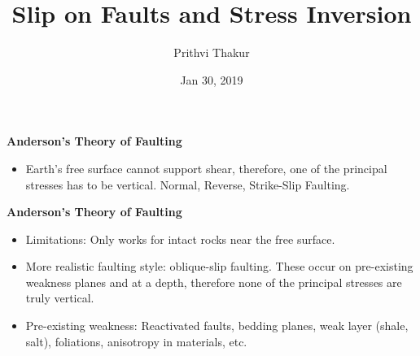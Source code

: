 \documentclass[11pt]{beamer}
\title{\textbf{Slip on Faults and Stress Inversion}}
\date{Jan 30, 2019}
\author{Prithvi Thakur}
\newcommand{\hl}[1]{\textcolor{myhl}{#1}}
\begin{document}
\maketitle

\begin{frame}{\textbf{Anderson's Theory of Faulting}}
    \begin{itemize}
        \item Earth's free surface cannot support shear, therefore, one of the principal stresses has to be vertical. \hl{Normal, Reverse, Strike-Slip Faulting}.
    \end{itemize}
\end{frame}

\begin{frame}{\textbf{Anderson's Theory of Faulting}}
    \begin{itemize}
        \item Limitations: Only works for intact rocks near the free surface. 
        \item More realistic faulting style: oblique-slip faulting. These occur on pre-existing weakness planes and at a depth, therefore none of the principal stresses are truly vertical.
        \item \hl{Pre-existing weakness:} Reactivated faults, bedding planes, weak layer (shale, salt), foliations, anisotropy in materials, etc.
    \end{itemize}
\end{frame}
\end{document}
